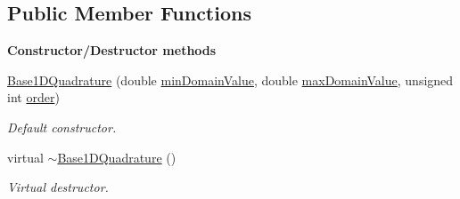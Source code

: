\subsection*{Public Member Functions}
\begin{Indent}{\bf Constructor/\-Destructor methods}\par
\begin{DoxyCompactItemize}
\item 
\hyperlink{class_q_u_e_s_o_1_1_base1_d_quadrature_a78007aa675ab263a24d86774e8b98c28}{Base1\-D\-Quadrature} (double \hyperlink{class_q_u_e_s_o_1_1_base1_d_quadrature_a938187458b0069e7b3779bc3739a1cc0}{min\-Domain\-Value}, double \hyperlink{class_q_u_e_s_o_1_1_base1_d_quadrature_af3d09abe6716a23f9061b8b657524547}{max\-Domain\-Value}, unsigned int \hyperlink{class_q_u_e_s_o_1_1_base1_d_quadrature_a07713b5e8df24bbc8e3e9d13b707e5d0}{order})
\begin{DoxyCompactList}\small\item\em Default constructor. \end{DoxyCompactList}\item 
virtual \hyperlink{class_q_u_e_s_o_1_1_base1_d_quadrature_acb90cfc1106240a7a48579e0594c7e17}{$\sim$\-Base1\-D\-Quadrature} ()
\begin{DoxyCompactList}\small\item\em Virtual destructor. \end{DoxyCompactList}\end{DoxyCompactItemize}
\end{Indent}
